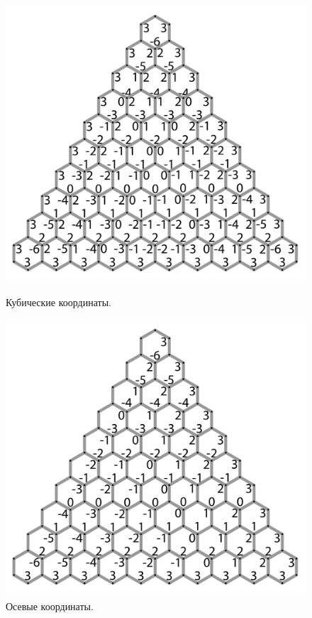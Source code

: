 \begin{figure}[h]
\begin{center}
\begin{minipage}[h]{0.47\linewidth}
\includegraphics[width=1\linewidth]{inc/img/hexagon_cube}
\caption{Кубические координаты.} %
\label{axis:cube} %
\end{minipage}
\hfill 
\begin{minipage}[h]{0.47\linewidth}
\includegraphics[width=1\linewidth]{inc/img/hexagon_axial}
\caption{Осевые координаты.}
\label{axis:axial}
\end{minipage}
\end{center}
\end{figure}


